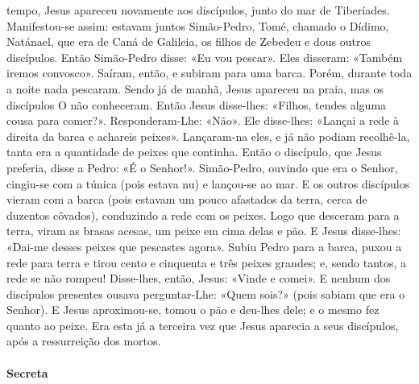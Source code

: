 \begin{paracol}{2}
{ tempo, Jesus apareceu novamente aos discípulos, junto do mar de Tiberíades. Manifestou-se assim: estavam juntos Simão-Pedro, Tomé, chamado o Dídimo, Natánael, que era de Caná de Galileia, os filhos de Zebedeu e dous outros discípulos. Então Simão-Pedro disse: «Eu vou pescar». Eles disseram: «Também iremos convosco». Saíram, então, e subiram para uma barca. Porém, durante toda a noite nada pescaram. Sendo já de manhã, Jesus apareceu na praia, mas os discípulos O não conheceram. Então Jesus disse-lhes: «Filhos, tendes alguma cousa para comer?». Responderam-Lhe: «Não». Ele disse-lhes: «Lançai a rede à direita da barca e achareis peixes». Lançaram-na eles, e já não podiam recolhê-la, tanta era a quantidade de peixes que continha. Então o discípulo, que Jesus preferia, disse a Pedro: «É o Senhor!». Simão-Pedro, ouvindo que era o Senhor, cingiu-se com a túnica (pois estava nu) e lançou-se ao mar. E os outros discípulos vieram com a barca (pois estavam um pouco afastados da terra, cerca de duzentos côvados), conduzindo a rede com os peixes. Logo que desceram para a terra, viram as brasas acesas, um peixe em cima delas e pão. E Jesus disse-lhes: «Dai-me desses peixes que pescastes agora». Subiu Pedro para a barca, puxou a rede para terra e tirou cento e cinquenta e três peixes grandes; e, sendo tantos, a rede se não rompeu! Disse-lhes, então, Jesus: «Vinde e comei». E nenhum dos discípulos presentes ousava perguntar-Lhe: «Quem sois?» (pois sabiam que era o Senhor). E Jesus aproximou-se, tomou o pão e deu-lhes dele; e o mesmo fez quanto ao peixe. Era esta já a terceira vez que Jesus aparecia a seus discípulos, após a ressurreição dos mortos.
}\end{paracol}

\begin{paracol}{2}\switchcolumn{}\end{paracol}

\paragraph{Secreta}
\begin{paracol}{2}\switchcolumn{}\end{paracol}

